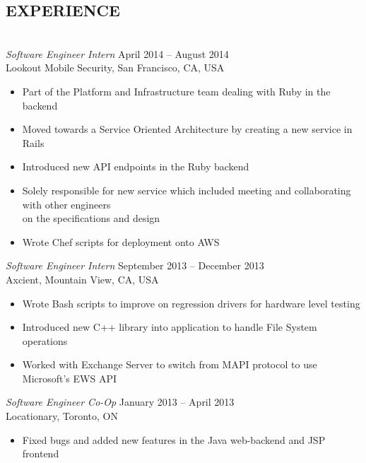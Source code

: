 \documentclass[a4paper, letterpaper]{res}
\begin{document}
\begin{resume}
\section{EXPERIENCE} 
				~\\[-2mm]
				{\sl Software Engineer Intern} \hspace*{3.1in}April 2014 -- August 2014 \\
				Lookout Mobile Security, San Francisco, CA, USA
				\begin{itemize} \itemsep -2pt
				\item Part of the Platform and Infrastructure team dealing with Ruby in the backend
				\item Moved towards a Service Oriented Architecture by creating a new service in Rails
				\item Introduced new API endpoints in the Ruby backend
				\item Solely responsible for new service which included meeting and collaborating with other engineers \\on the specifications and design
				\item Wrote Chef scripts for deployment onto AWS
				\end{itemize}
				{\sl Software Engineer Intern} \hspace*{2.6in}September 2013 -- December 2013  \\
				Axcient, Mountain View, CA, USA
                 \begin{itemize}  \itemsep -2pt %
                 \item Wrote Bash scripts to improve on regression drivers for hardware level testing
                 \item Introduced new C++ library into application to handle File System operations
                 \item Worked with Exchange Server to switch from MAPI protocol to use Microsoft's EWS API
                 \end{itemize} 
				{\sl Software Engineer Co-Op} \hspace*{3in}January 2013 -- April 2013 \\
				Locationary, Toronto, ON 
                 \begin{itemize}  \itemsep -2pt %
                 \item Fixed bugs and added new features in the Java web-backend and JSP frontend

\end{itemize}
\end{resume}
\end{document}
